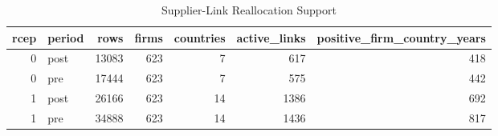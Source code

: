 \begin{table}
\caption{Supplier-Link Reallocation Support}
\label{tab:table1_support_gate}
\begin{tabular}{rlrrrrr}
\toprule
rcep & period & rows & firms & countries & active_links & positive_firm_country_years \\
\midrule
0 & post & 13083 & 623 & 7 & 617 & 418 \\
0 & pre & 17444 & 623 & 7 & 575 & 442 \\
1 & post & 26166 & 623 & 14 & 1386 & 692 \\
1 & pre & 34888 & 623 & 14 & 1436 & 817 \\
\bottomrule
\end{tabular}
\end{table}
